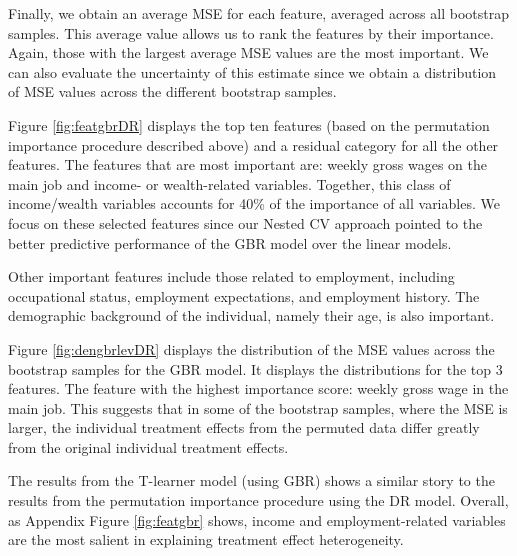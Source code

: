 \documentclass[12pt, a4paper]{article}
\begin{document}
Finally, we obtain an average MSE for each feature, averaged across all
bootstrap samples. This average value allows us to rank the features by their
importance. Again, those with the largest average MSE values are the most
important. We can also evaluate the uncertainty of this estimate since we
obtain a distribution of MSE values across the different bootstrap samples.

Figure \ref{fig:featgbrDR} displays the top ten features (based on the
permutation importance procedure described above) and a residual category for
all the other features. The features that are most important are: weekly gross
wages on the main job and income- or wealth-related variables. Together, this
class of income/wealth variables accounts for 40\% of the importance of all
variables. We focus on these selected features since our Nested CV approach
pointed to the better predictive performance of the GBR model over the linear
models.

Other important features include those related to employment, including
occupational status, employment expectations, and employment history. The
demographic background of the individual, namely their age, is also important. 


Figure \ref{fig:dengbrlevDR} displays the distribution of the MSE values across
the bootstrap samples for the GBR model. It displays the distributions for the
top 3 features. The feature with the highest importance score: weekly gross
wage in the main job. This suggests that in some of the bootstrap samples,
where the MSE is larger, the individual treatment effects from the permuted
data differ greatly from the original individual treatment effects.

The results from the T-learner model (using GBR) shows a similar story to the
results from the permutation importance procedure using the DR model. Overall,
as Appendix Figure \ref{fig:featgbr} shows, income and employment-related
variables are the most salient in explaining treatment effect heterogeneity. 


\end{document}
